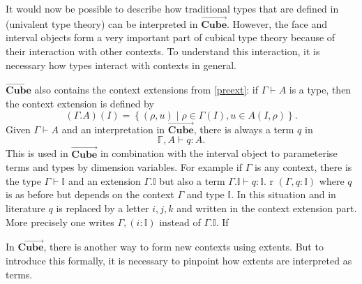 \documentclass[12pt,a4paper,twoside,xetex]{book} %
\newcommand{\psh}[1]{\overrightarrow{#1}}
\newcommand{\cube}[0]{\textbf{Cube}}
\begin{document}
It would now be possible to describe how traditional types that are defined in 
(univalent type theory) can be interpreted in $\psh{\cube}$. 
However, the face and interval objects form a very important part of cubical 
type theory because of their interaction with other contexts. To understand 
this interaction, it is necessary how types interact with contexts in general.  

$\psh{\cube}$ also contains the context extensions from 
\cref{preext}: if $\Gamma \vdash A$ is a type, then the context extension is 
defined by $$(\Gamma . A)(I) = \left\{ (\rho , u ) \mid \rho \in \Gamma (I), u 
\in A (I,\rho) \right\}.$$
Given $\Gamma \vdash A$ and an interpretation in $\psh{\cube}$, there is 
always a term $q$ in $$\mathbb{\Gamma}, A \vdash q : A.$$ This is used in 
$\psh{\cube}$ in combination with the interval object to parameterise 
terms and types by dimension variables. For example if $\Gamma$ is any context, 
there is the type $\Gamma \vdash \mathbb{I}$ and an extension $\Gamma. 
\mathbb{I}$ but also a term $\Gamma. \mathbb{I} \vdash q : \mathbb{I}$.
r $(\Gamma, q : \mathbb{I})$ where $q$ is as before but depends on the context 
$\Gamma$ and type $\mathbb{I}$. In this situation and in literature $q$ is 
replaced by a letter $i,j,k$ and written in the context extension part. More 
precisely one writes $\Gamma, (i: \mathbb{I})$ instead of $\Gamma . 
\mathbb{I}$. If 

In $\psh{\cube}$, there is another way to form new 
contexts using extents. But to introduce this formally, it is necessary to 
pinpoint how extents are interpreted as terms.
\end{document}
